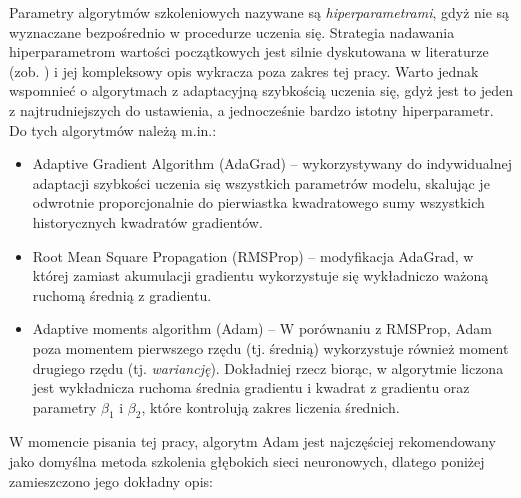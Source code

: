 Parametry algorytmów szkoleniowych nazywane są \textit{hiperparametrami}, gdyż nie są wyznaczane bezpośrednio w procedurze uczenia się. Strategia nadawania hiperparametrom wartości początkowych jest silnie dyskutowana w literaturze (zob. \cite{Koch2017AutomatedHT}) i jej kompleksowy opis wykracza poza zakres tej pracy. Warto jednak wspomnieć o algorytmach z adaptacyjną szybkością uczenia się, gdyż jest to jeden z najtrudniejszych do ustawienia, a jednocześnie bardzo istotny hiperparametr. Do tych algorytmów należą m.in.:
\begin{itemize}[noitemsep,nolistsep]
 \item Adaptive Gradient Algorithm (AdaGrad) \cite{Duchi:2011:ASM:1953048.2021068} -- wykorzystywany do indywidualnej adaptacji szybkości uczenia się wszystkich parametrów modelu, skalując je odwrotnie proporcjonalnie do pierwiastka kwadratowego sumy wszystkich historycznych kwadratów gradientów.
 \item Root Mean Square Propagation (RMSProp) \cite{SCHMIDHUBER201585} -- modyfikacja AdaGrad, w której zamiast akumulacji gradientu wykorzystuje się wykładniczo ważoną ruchomą średnią z gradientu.
 \item Adaptive moments algorithm (Adam) \cite{DBLP:journals/corr/KingmaB14} -- W porównaniu z RMSProp, Adam poza momentem pierwszego rzędu (tj. średnią) wykorzystuje również moment drugiego rzędu (tj. \textit{wariancję}). Dokładniej rzecz biorąc, w algorytmie liczona jest wykładnicza ruchoma średnia gradientu i kwadrat z gradientu oraz parametry $\beta_1$ i $\beta_2$, które kontrolują zakres liczenia średnich.
\end{itemize}
\newpage
W momencie pisania tej pracy, algorytm Adam jest najczęściej rekomendowany jako domyślna metoda szkolenia głębokich sieci neuronowych, dlatego poniżej zamieszczono jego dokładny opis:
